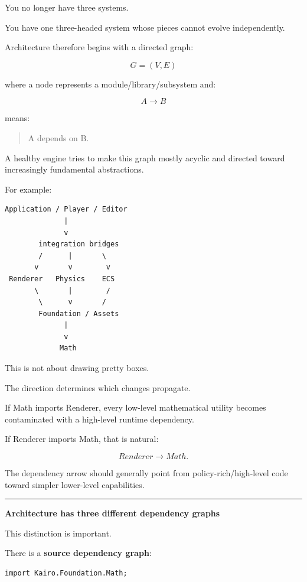 You no longer have three systems.

You have one three-headed system whose pieces cannot evolve independently.

Architecture therefore begins with a directed graph:

\[
G=(V,E)
\]

where a node represents a module/library/subsystem and:

\[
A\rightarrow B
\]

means:

\begin{quote}
A depends on B.
\end{quote}

A healthy engine tries to make this graph mostly acyclic and directed toward increasingly fundamental abstractions.

For example:

\begin{verbatim}
Application / Player / Editor
              |
              v
        integration bridges
        /      |       \
       v       v        v
 Renderer   Physics    ECS
       \       |        /
        \      v       /
        Foundation / Assets
              |
              v
             Math
\end{verbatim}

This is not about drawing pretty boxes.

The direction determines which changes propagate.

If Math imports Renderer, every low-level mathematical utility becomes contaminated with a high-level runtime dependency.

If Renderer imports Math, that is natural:

\[
Renderer\rightarrow Math.
\]

The dependency arrow should generally point from policy-rich/high-level code toward simpler lower-level capabilities.

\begin{center}\rule{0.5\linewidth}{0.5pt}\end{center}

\textbf{Architecture has three different dependency graphs}

This distinction is important.

There is a \textbf{source dependency graph}:

\begin{verbatim}
import Kairo.Foundation.Math;
\end{verbatim}

